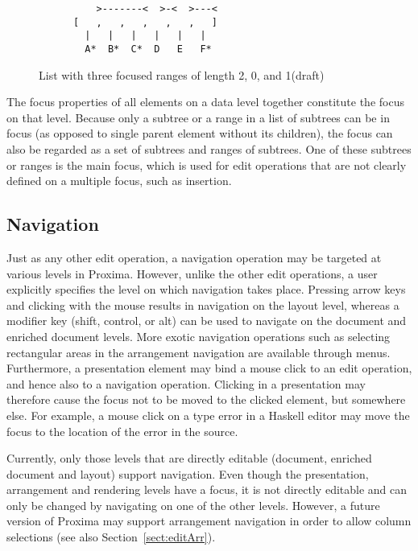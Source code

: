 \begin{figure}
\begin{small}
\begin{center}
\begin{verbatim}
          >-------<  >-<  >---<          
      [   ,   ,   ,   ,   ,   ]
        |   |   |   |   |   |
        A*  B*  C*  D   E   F*

\end{verbatim}
\caption{List with three focused ranges of length 2, 0, and 1(draft)}\label{listFocus} 
\end{center}
\end{small}
\end{figure}


The focus properties of all elements on a data level together constitute the focus on that level. Because only a subtree or a range in a list of subtrees can be in focus (as opposed to single parent element without its children), the focus can also be regarded as a set of subtrees and ranges of subtrees. One of these subtrees or ranges is the main focus, which is used for edit operations that are not clearly defined on a multiple focus, such as insertion.
 
 
%																
\subsection{Navigation}

Just as any other edit operation, a navigation operation may be targeted at various levels in Proxima. However, unlike the other edit operations, a user explicitly specifies the level on which navigation takes place. Pressing arrow keys and clicking with the mouse results in navigation on the layout level, whereas a modifier key (shift, control, or alt) can be used to navigate on the document and enriched document levels. \bc More exotic navigation operations such as selecting rectangular areas in the arrangement navigation are available through menus. \ec Furthermore, a presentation element may bind a mouse click to an edit operation, and hence also to a navigation operation. Clicking in a presentation may therefore cause the focus not to be moved to the clicked element, but somewhere else. For example, a mouse click on a type error in a Haskell editor may move the focus to the location of the error in the source.

Currently, only those levels that are directly editable (document, enriched document and layout) support navigation. Even though the presentation, arrangement and rendering levels have a focus, it is not directly editable and can only be changed by navigating on one of the other levels. However, a future version of Proxima may support arrangement navigation in order to allow column selections (see also Section~\ref{sect:editArr}).

